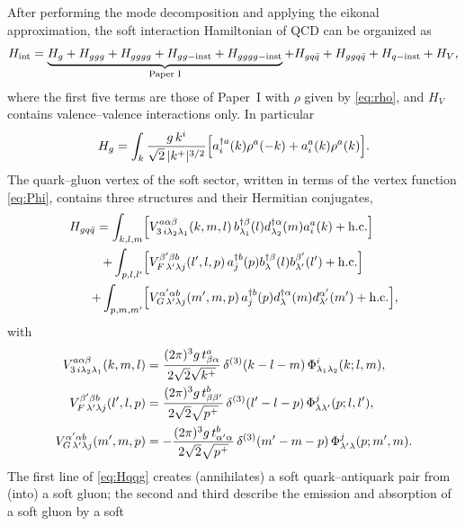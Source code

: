 After performing the mode decomposition and applying the eikonal approximation, the soft
interaction Hamiltonian of QCD can be organized as
\begin{equation}
H_{\rm int}=\underbrace{H_{g}+H_{ggg}+H_{gggg}+H_{gg-{\rm inst}}+H_{gggg-{\rm inst}}}_{\text{Paper~I}}
+H_{gq\bar q}+H_{ggq\bar q}+H_{q-{\rm inst}}+H_{V},
\label{eq:Hint}
\end{equation}
where the first five terms are those of Paper~I with $\rho$ given by \eqref{eq:rho}, and $H_{V}$
contains valence--valence interactions only. In particular
\begin{equation}
H_{g}=\int_{k}\frac{g\,k^{i}}{\sqrt2\,|k^{+}|^{3/2}}
\Big[a^{\dagger a}_{i}(k)\rho^{a}(-k)+a^{a}_{i}(k)\rho^{a}(k)\Big].
\label{eq:Hg}
\end{equation}
The quark--gluon vertex of the soft sector, written in terms of the vertex function
\eqref{eq:Phi}, contains three structures and their Hermitian conjugates,
\begin{align}
H_{gq\bar q}=\int_{k,l,m}&\Big[V^{a\alpha\beta}_{3\,i\lambda_{2}\lambda_{1}}(k,m,l)\,
b^{\dagger\beta}_{\lambda_{1}}(l)d^{\dagger\alpha}_{\lambda_{2}}(m)a^{a}_{i}(k)+{\rm h.c.}\Big]
\nonumber\\
+\int_{p,l,l'}&\Big[V^{\beta'\beta b}_{F\,\lambda'\lambda j}(l',l,p)\,
a^{\dagger b}_{j}(p)b^{\dagger\beta}_{\lambda}(l)b^{\beta'}_{\lambda'}(l')+{\rm h.c.}\Big]
\nonumber\\
+\int_{p,m,m'}&\Big[V^{\alpha'\alpha b}_{G\,\lambda'\lambda j}(m',m,p)\,
a^{\dagger b}_{j}(p)d^{\dagger\alpha}_{\lambda}(m)d^{\alpha'}_{\lambda'}(m')+{\rm h.c.}\Big],
\label{eq:Hqqg}
\end{align}
with
\begin{align}
V^{a\alpha\beta}_{3\,i\lambda_{2}\lambda_{1}}(k,m,l)&=\frac{(2\pi)^{3}g\,t^{a}_{\beta\alpha}}{2\sqrt2\sqrt{k^{+}}}\,
\delta^{(3)}(k-l-m)\,\Phi^{i}_{\lambda_{1}\lambda_{2}}(k;l,m),
\label{eq:V3}\\
V^{\beta'\beta b}_{F\,\lambda'\lambda j}(l',l,p)&=\frac{(2\pi)^{3}g\,t^{b}_{\beta\beta'}}{2\sqrt2\sqrt{p^{+}}}\,
\delta^{(3)}(l'-l-p)\,\Phi^{j}_{\lambda\lambda'}(p;l,l'),
\label{eq:VF}\\
V^{\alpha'\alpha b}_{G\,\lambda'\lambda j}(m',m,p)&=-\frac{(2\pi)^{3}g\,t^{b}_{\alpha'\alpha}}{2\sqrt2\sqrt{p^{+}}}\,
\delta^{(3)}(m'-m-p)\,\Phi^{j}_{\lambda'\lambda}(p;m',m).
\label{eq:VG}
\end{align}
The first line of \eqref{eq:Hqqg} creates (annihilates) a soft quark--antiquark pair from (into) a
soft gluon; the second and third describe the emission and absorption of a soft gluon by a soft
